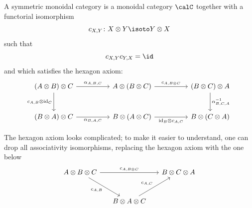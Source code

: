 \begin{definition}\label{d:symmetric}
  A symmetric monoidal category is a monoidal category $\calC$ together
  with a functorial isomorphism
  $$
    c_{X,Y}\colon X\otimes Y \isoto Y\otimes X
  $$
  such that
  $$
  c_{X,Y} c_{Y,X}=\id
  $$
  and which satisfies the hexagon axiom:
  \begin{equation}\label{e:hexagon1}
    \begin{tikzcd}[column sep=huge, row sep=large]
      (A\otimes B)\otimes C
      \arrow[r,"\alpha_{A,B,C}"]
      \arrow[d,"c_{A,B}\otimes \mathrm{id}_C"']
      & A\otimes(B\otimes C)
      \arrow[r,"c_{A,B\otimes C}"]
      & (B\otimes C)\otimes A
      \arrow[d,"\alpha^{-1}_{B,C,A}"] \\
      (B\otimes A)\otimes C
      \arrow[r,"\alpha_{B,A,C}"']
      & B\otimes(A\otimes C)
      \arrow[r,"\mathrm{id}_B\otimes c_{A,C}"']
      & B\otimes(C\otimes A)
    \end{tikzcd}
  \end{equation}
\end{definition}
The hexagon axiom looks complicated; to make it easier to understand, one
can drop all associativity isomorphisms, replacing the hexagon axiom with the
one below
\begin{equation}\label{e:hexagon3}
  \begin{tikzcd}[column sep=5mm, row sep=large]
    A\otimes B\otimes C
    \arrow[rr,"c_{A, B\otimes C}"]
    \arrow[dr,"c_{A,B}"']
    && B\otimes C\otimes A\\
    & B\otimes A\otimes C
    \arrow[ur,"c_{A,C}"]  &
  \end{tikzcd}
\end{equation}

